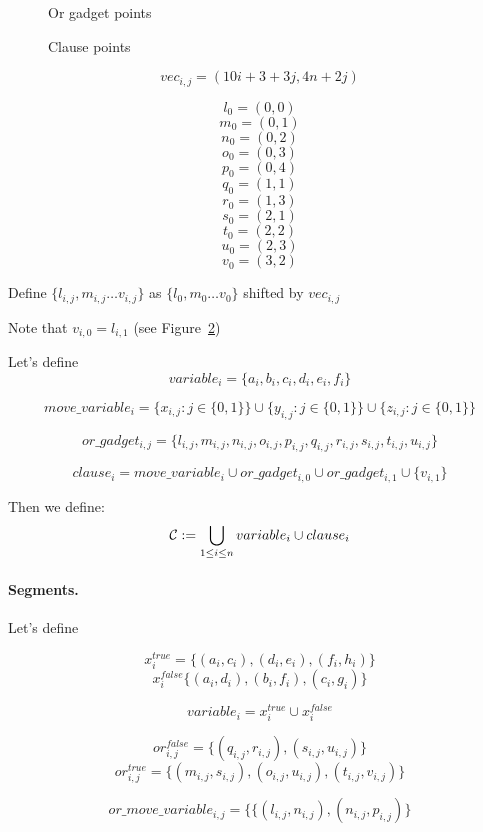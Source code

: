 	
	
\begin{figure}[h]
\centering
\def\svgwidth{0.5\columnwidth}

\caption{Or gadget points}
\label{fig:apx_or_gadget}
\end{figure}


\begin{figure}[h]
\centering
\def\svgwidth{0.8\columnwidth}

\caption{Clause points}
\label{fig:apx_clause}
\end{figure}
	$$vec_{i, j} = (10i + 3 + 3j, 4n + 2j)$$
	
	$$l_0 = (0, 0)$$
	$$m_0 = (0, 1)$$
	$$n_0 = (0, 2)$$
	$$o_0 = (0, 3)$$
	$$p_0 = (0, 4)$$
	$$q_0 = (1, 1)$$
	$$r_0 = (1, 3)$$
	$$s_0 = (2, 1)$$
	$$t_0 = (2, 2)$$
	$$u_0 = (2, 3)$$
	$$v_0 = (3, 2)$$
	
	
	Define 
	$\{ l_{i, j}, m_{i, j} \ldots v_{i, j} \}$
	as $\{l_0, m_0 \ldots v_0\}$ shifted by $vec_{i, j}$

Note that $v_{i, 0} = l_{i, 1}$ (see Figure~\ref{fig:apx_clause})

Let's define $$variable_i =  \{a_i, b_i, c_i, d_i, e_i, f_i\}$$	
 
 $$move\_variable_i = 
 \{x_{i, j} : j \in \{0, 1\}\} \cup
 \{y_{i, j} : j \in \{0, 1\}\} \cup
 \{z_{i, j} : j \in \{0, 1\}\} 
 $$
 
 $$or\_gadget_{i, j} = 
 \{l_{i, j}, m_{i, j}, n_{i, j}, o_{i, j},
 p_{i, j}, q_{i, j}, r_{i, j}, s_{i, j}, t_{i, j}, u_{i, j} \}
 $$
 
 $$clause_i = 
 move\_variable_i \cup or\_gadget_{i, 0} \cup or\_gadget_{i, 1} \cup \{v_{i, 1} \} 
 $$
 

Then we define:
$$\mathcal{C} := \bigcup_{1 \le i \le n} variable_i \cup clause_i $$


\paragraph{Segments.}

Let's define 

$$x^{true}_i = \{(a_i, c_i), (d_i, e_i), (f_i, h_i)\}$$
$$x^{false}_i \{ (a_i, d_i), (b_i, f_i), (c_i, g_i)\}$$

$$variable_i = x^{true}_i \cup x^{false}_i$$

$$or^{false}_{i, j} = \{ (q_{i, j}, r_{i, j}), (s_{i, j}, u_{i, j})\}$$
$$or^{true}_{i, j} = \{ (m_{i, j}, s_{i, j}), (o_{i, j}, u_{i, j}),(t_{i, j}, v_{i, j}) \}$$

$$or\_move\_variable_{i, j} = \{ \{ (l_{i, j}, n_{i, j}), (n_{i, j}, p_{i, j})\}$$

